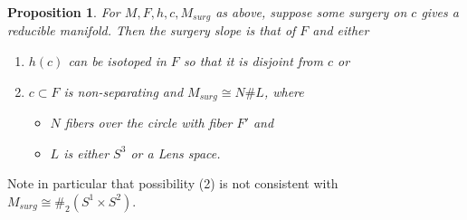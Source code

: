 \documentclass{amsart}
\newtheorem{prop}[thm]{Proposition}
\begin{document}
\begin{prop}  \label{prop:monodromy} For $M, F, h, c, M_{surg}$ as above, suppose some surgery on $c$ gives a reducible manifold.  Then the surgery slope is that of $F$ and either
\begin{enumerate}
\item $h(c)$ can be isotoped in $F$ so that it is disjoint from $c$ or
\item $c \subset F$ is non-separating and $M_{surg} \cong N \# L$, where
\begin{itemize}
\item $N$ fibers over the circle with fiber $F'$ and
\item $L$ is either $S^3$ or a Lens space.
\end{itemize}
\end{enumerate}

\end{prop}

Note in particular that possibility (2) is not consistent with $M_{surg} \cong \#_{2} (S^{1} \times S^{2})$.
\end{document}
